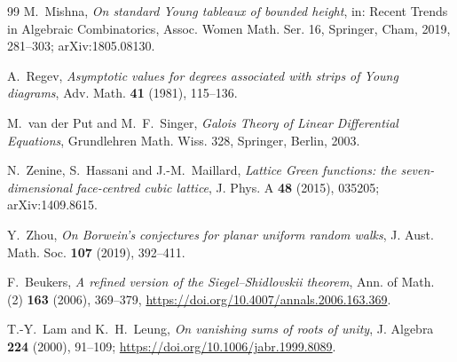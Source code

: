 \documentclass[11pt]{amsart}
\theoremstyle{definition}
\begin{document}
\begin{thebibliography}{99}
M.~Mishna,
\emph{On standard Young tableaux of bounded height},
in: Recent Trends in Algebraic Combinatorics, Assoc. Women Math. Ser. 16, Springer, Cham, 2019, 281--303; arXiv:1805.08130.

A.~Regev,
\emph{Asymptotic values for degrees associated with strips of Young diagrams},
Adv. Math. \textbf{41} (1981), 115--136.

M.~van der Put and M.~F.~Singer,
\emph{Galois Theory of Linear Differential Equations},
Grundlehren Math. Wiss. 328, Springer, Berlin, 2003.

N.~Zenine, S.~Hassani and J.-M.~Maillard,
\emph{Lattice Green functions: the seven-dimensional face-centred cubic lattice},
J. Phys. A \textbf{48} (2015), 035205; arXiv:1409.8615.

Y.~Zhou,
\emph{On Borwein's conjectures for planar uniform random walks},
J. Aust. Math. Soc. \textbf{107} (2019), 392--411.

F.~Beukers,
\emph{A refined version of the Siegel--Shidlovskii theorem},
Ann. of Math. (2) \textbf{163} (2006), 369--379,
\url{https://doi.org/10.4007/annals.2006.163.369}.

T.-Y.~Lam and K.~H.~Leung,
\emph{On vanishing sums of roots of unity},
J. Algebra \textbf{224} (2000), 91--109;
\url{https://doi.org/10.1006/jabr.1999.8089}.

\end{thebibliography}
\end{document}

